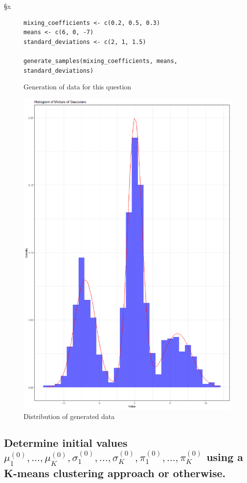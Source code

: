 §x\documentclass[]{article}
\begin{document}
\begin{figure}[H]
	\captionsetup{type=lstlisting}
	\begin{lstlisting}
mixing_coefficients <- c(0.2, 0.5, 0.3)
means <- c(6, 0, -7)
standard_deviations <- c(2, 1, 1.5)

generate_samples(mixing_coefficients, means, standard_deviations)			
		\end{lstlisting}
	\caption{Generation of data for this question}
	\label{lst:gem-gausmix}
\end{figure}

\begin{figure}[H]
	\centering
	\includegraphics[width=0.5\linewidth]{img/img-5-1}
	\caption{Distribution of generated data}
	\label{fig:img-5-1}
\end{figure}


\subsection{Determine initial values $\mu_1^{(0)}, \dots, \mu_K^{(0)}, \sigma_1^{(0)}, \dots, \sigma_K^{(0)}, \pi_1^{(0)}, \dots, \pi_K^{(0)}$ 	using a K-means clustering approach or otherwise.
}
\end{document}
